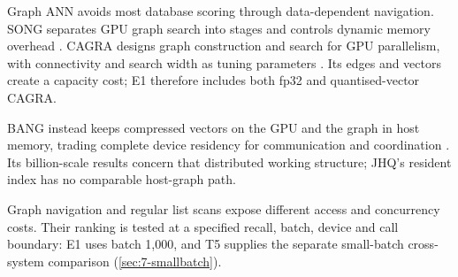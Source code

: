 Graph ANN avoids most database scoring through data-dependent navigation.
SONG separates GPU graph search into stages and controls dynamic memory
overhead \cite{song}. CAGRA designs graph construction and search for GPU
parallelism, with connectivity and search width as tuning parameters
\cite{cagra}. Its edges and vectors create a capacity cost; E1 therefore
includes both fp32 and quantised-vector CAGRA.

BANG instead keeps compressed vectors on the GPU and the graph in host
memory, trading complete device residency for communication and coordination
\cite{bang}. Its billion-scale results concern that distributed working
structure; JHQ's resident index has no comparable host-graph path.

Graph navigation and regular list scans expose different access and
concurrency costs. Their ranking is tested at a specified recall, batch,
device and call boundary: E1 uses batch 1,000, and T5 supplies the separate
small-batch cross-system comparison (\cref{sec:7-smallbatch}).
